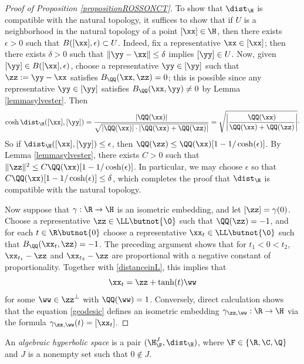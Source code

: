 \begin{proof}[Proof of Proposition \ref{propositionROSSONCT}]
To show that $\dist_\H$ is compatible with the natural topology, it suffices to show that if $U$ is a neighborhood in the natural topology of a point $[\xx]\in\H$, then there exists $\epsilon > 0$ such that $B([\xx],\epsilon) \subset U$. Indeed, fix a representative $\xx\in [\xx]$; then there exists $\delta > 0$ such that $\|\yy - \xx\|\leq \delta$ implies $[\yy]\in U$. Now, given $[\yy]\in B([\xx],\epsilon)$, choose a representative $\yy\in [\yy]$ such that $\zz := \yy - \xx$ satisfies $B_\QQ(\xx,\zz) = 0$; this is possible since any representative $\yy\in[\yy]$ satisfies $B_\QQ(\xx,\yy)\neq 0$ by Lemma \ref{lemmasylvester}. Then
\[
\cosh\dist_\H([\xx],[\yy]) = \frac{|\QQ(\xx)|}{\sqrt{|\QQ(\xx)| \cdot |\QQ(\xx) + \QQ(\zz)|}} = \sqrt{\left|\frac{\QQ(\xx)}{\QQ(\xx) + \QQ(\zz)}\right|}\cdot
\]
So if $\dist_\H([\xx],[\yy]) \leq \epsilon$, then $\QQ(\zz)\leq \QQ(\xx)[1 - 1/\cosh(\epsilon)]$. By Lemma \ref{lemmasylvester}, there exists $C > 0$ such that $\|\zz\|^2 \leq C\QQ(\xx)[1 - 1/\cosh(\epsilon)]$. In particular, we may choose $\epsilon$ so that $C\QQ(\xx)[1 - 1/\cosh(\epsilon)] \leq \delta$, which completes the proof that $\dist_\H$ is compatible with the natural topology.

Now suppose that $\gamma:\R\to \H$ is an isometric embedding, and let $[\zz] = \gamma(0)$. Choose a representative $\zz\in\LL\butnot\{\0\}$ such that $\QQ(\zz) = -1$, and for each $t\in\R\butnot\{0\}$ choose a representative $\xx_t\in \LL\butnot\{\0\}$ such that $B_\QQ(\xx_t,\zz) = -1$. The preceding argument shows that for $t_1 < 0 < t_2$, $\xx_{t_1} - \zz$ and $\xx_{t_2} - \zz$ are proportional with a negative constant of proportionality. Together with \eqref{distanceinL}, this implies that
\begin{equation}
\label{geodesic}
\xx_t = \zz + \tanh(t)\ww
\end{equation}
for some $\ww\in \zz^\perp$ with $\QQ(\ww) = 1$. Conversely, direct calculation shows that the equation \eqref{geodesic} defines an isometric embedding $\gamma_{\zz,\ww}:\R\to\H$ via the formula $\gamma_{\zz,\ww}(t) = [\xx_t]$.
\end{proof}

\begin{definition}
\label{definitionROSSONCT}
An \emph{algebraic hyperbolic space} is a pair $(\H_\F^J,\dist_\H)$, where $\F\in\{\R,\C,\Q\}$ and $J$ is a nonempty set such that $0\notin J$. 
\end{definition}


